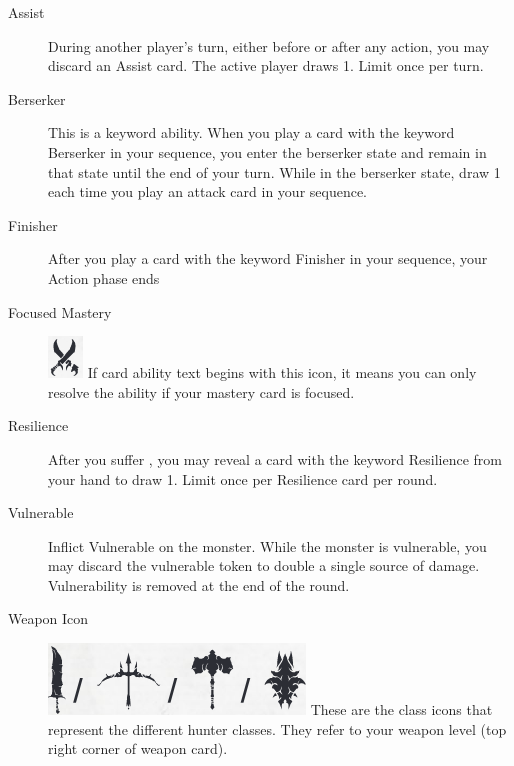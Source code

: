 \documentclass[12pt]{article}
\begin{document}
\begin{mdframed}[style=SummaryCard, align=center, userdefinedwidth=35em, frametitle={Important Keywords (Dareon)}]
    \begin{description}
        \item[Assist] During another player’s turn, either before or after any action, you may discard an Assist card. The active player draws 1. Limit once per turn.
        \item[Berserker] This is a keyword ability. When you play a card with the keyword Berserker in your sequence, you enter the berserker state and remain in that state until the end of your turn. While in the berserker state, draw 1 each time you play an attack card in your sequence.
        \item[Finisher] After you play a card with the keyword Finisher in your sequence, your Action phase ends
        \item[Focused Mastery] \includegraphics[scale=0.30]{images/mastery_icon.png} If card ability text begins with this icon, it means you can only resolve the ability if your mastery card is focused.
        \item[Resilience] After you suffer , you may reveal a card with the keyword Resilience from your hand to draw 1. Limit once per Resilience card per round.
        \item[Vulnerable] Inflict Vulnerable on the monster. While the monster is vulnerable, you may discard the vulnerable token to double a single source of damage. Vulnerability is removed at the end of the round.
        \item[Weapon Icon] \includegraphics[scale=0.20]{images/weapon_level.png} These are the class icons that represent the different hunter classes. They refer to your weapon level (top right corner of weapon card).
    \end{description}
\end{mdframed}

\pagebreak
\end{document}
